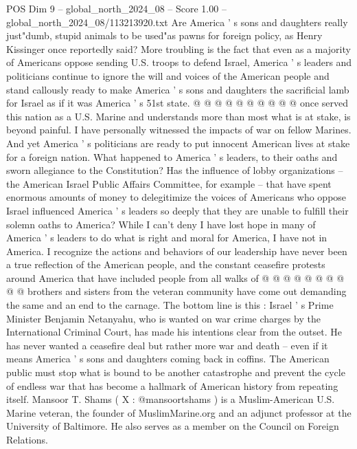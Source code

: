 \begin{textsample}{POS Dim 9 – global\_north\_2024\_08 – Score 1.00 – global\_north\_2024\_08/113213920.txt}
Are America ' s sons and daughters really just"dumb, stupid animals to be used"as pawns for foreign policy, as Henry Kissinger once reportedly said?
More troubling is the fact that even as a majority of Americans oppose sending U.S. troops to defend Israel, America ' s leaders and politicians continue to ignore the will and voices of the American people and stand callously ready to make America ' s sons and daughters the sacrificial lamb for Israel as if it was America ' s 51st state. @ @ @ @ @ @ @ @ @ @ once served this nation as a U.S.
Marine and understands more than most what is at stake, is beyond painful.
I have personally witnessed the impacts of war on fellow Marines.
And yet America ' s politicians are ready to put innocent American lives at stake for a foreign nation.
What happened to America ' s leaders, to their oaths and sworn allegiance to the Constitution?
Has the influence of lobby organizations -- the American Israel Public Affairs Committee, for example -- that have spent enormous amounts of money to delegitimize the voices of Americans who oppose Israel influenced America ' s leaders so deeply that they are unable to fulfill their solemn oaths to America?
While I can't deny I have lost hope in many of America ' s leaders to do what is right and moral for America, I have not in America.
I recognize the actions and behaviors of our leadership have never been a true reflection of the American people, and the constant ceasefire protests around America that have included people from all walks of @ @ @ @ @ @ @ @ @ @ brothers and sisters from the veteran community have come out demanding the same and an end to the carnage.
The bottom line is this : Israel ' s Prime Minister Benjamin Netanyahu, who is wanted on war crime charges by the International Criminal Court, has made his intentions clear from the outset.
He has never wanted a ceasefire deal but rather more war and death -- even if it means America ' s sons and daughters coming back in coffins.
The American public must stop what is bound to be another catastrophe and prevent the cycle of endless war that has become a hallmark of American history from repeating itself.
Mansoor T.
Shams ( X : @mansoortshams ) is a Muslim-American U.S.
Marine veteran, the founder of MuslimMarine.org and an adjunct professor at the University of Baltimore.
He also serves as a member on the Council on Foreign Relations.

\end{textsample}
